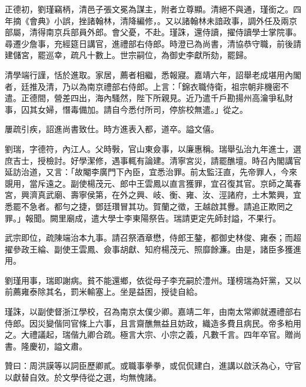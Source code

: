\begin{pinyinscope}
正德初，劉瑾竊柄，清邑子張文冕為謀主，附者立尊顯。清絕不與通，瑾銜之。四年摘《會典》小誤，挫諸翰林，清降編修，。又以諸翰林未諳政事，調外任及兩京部屬，清得南京兵部員外郎。會父憂，不赴。瑾誅，還侍讀，擢侍讀學士掌院事。尋遷少詹事，充經筵日講官，進禮部右侍郎。時澄已為尚書，清協恭守職，前後請建儲宮，罷巡幸，疏凡十數上。世宗嗣位，為御史李獻所劾，罷歸。

清學端行謹，恬於進取。家居，薦者相繼，悉報寢。嘉靖六年，詔舉老成堪用內閣者，廷推及清，乃以為南京禮部右侍郎。上言：「錦衣職侍衛，祖宗朝非機密不遣。正德間，營差四出，海內騷然，陛下所親見。近乃遣千戶勘揚州高瀹爭私財事，囚其女婦，憯毒備加。請自今悉付所司，停旂校無遣。」從之。

屢疏引疾，詔進尚書致仕。時方進表入都，道卒。謚文僖。

劉瑞，字德符，內江人。父時斅，官山東僉事，以廉惠稱。瑞舉弘治九年進士，選庶吉士，授檢討。好學潔修，遇事輒有論建。清寧宮災，請罷醮壇。時召內閣講官延訪治道，又言：「故閹李廣門下內臣，宜悉治罪。前太監汪直，先帝罪人，今來覬用，當斥遠之。副使楊茂元、郎中王雲鳳以直言獲罪，宜召復其官。京師之萬春宮，興濟真武廟、壽寧侯第，在外之興、岐、衡、雍、汝、涇諸府，土木繁興，宜悉罷不急者。都勻之捷，鄧廷瓚冒其功。賀蘭之徵，王越啟其釁。請追正欺罔之罪。」報聞。闕里廟成，遣大學士李東陽祭告。瑞請更定先師封謚，不果行。

武宗即位，疏陳端治本九事。請召祭酒章懋，侍郎王鏊，都御史林俊、雍泰；而超擢參政王綸、副使王雲鳳、僉事胡獻、知府楊茂元、照靡餘濂。由是，諸臣多獲進用。

劉瑾用事，瑞即謝病。貧不能還鄉，依從母子李充嗣於澧州。瑾榜瑞為奸黨，又以前薦雍泰除其名，罰米輸塞上。坐是益困，授徒自給。

瑾誅，以副使督浙江學校，召為南京太僕少卿。嘉靖二年，由南太常卿就遷禮部右侍郎。因災變偕同官條上六事，且言齋醮無益且妨政，織造多費且病民。帝多粕用之。大禮議起，瑞偕九卿合疏。極言大宗、小宗之義，凡數千言。四年卒官。贈尚書。隆慶初，謚文肅。

贊曰：周洪謨等以詞臣歷卿貳。或職事拳拳，或侃侃建白，進講以啟沃為心，守官以獻替自效。於文學侍從之選，均無愧諸。


\end{pinyinscope}